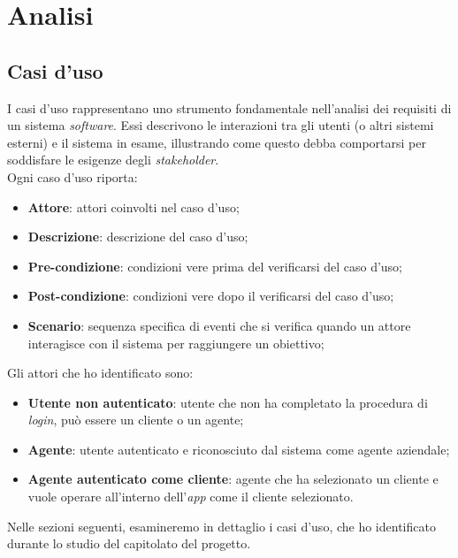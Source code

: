 \section{Analisi}
\subsection{Casi d'uso}
I casi d'uso rappresentano uno strumento fondamentale nell'analisi dei requisiti di un sistema \textit{software}. Essi descrivono 
le interazioni tra gli utenti (o altri sistemi esterni) e il sistema in esame, illustrando come questo debba comportarsi per 
soddisfare le esigenze degli \textit{stakeholder}.\\
Ogni caso d'uso riporta:
\begin{itemize}
    \item \textbf{Attore}: attori coinvolti nel caso d'uso;
    \item \textbf{Descrizione}: descrizione del caso d'uso;
    \item \textbf{Pre-condizione}: condizioni vere prima del verificarsi del caso d'uso;
    \item \textbf{Post-condizione}: condizioni vere dopo il verificarsi del caso d'uso;
    \item \textbf{Scenario}: sequenza specifica di eventi che si verifica quando un attore interagisce con il sistema 
                             per raggiungere un obiettivo;
\end{itemize}
Gli attori che ho identificato sono:
\begin{itemize}
    \item \textbf{Utente non autenticato}: utente che non ha completato la procedura di \textit{login}, può essere un cliente o un agente;
    \item \textbf{Agente}: utente autenticato e riconosciuto dal sistema come agente aziendale;
    \item \textbf{Agente autenticato come cliente}: agente che ha selezionato un cliente e vuole operare all'interno dell'\textit{app} come il cliente selezionato.
\end{itemize}
Nelle sezioni seguenti, esamineremo in dettaglio i casi d'uso, che ho identificato durante lo studio del capitolato del progetto.








